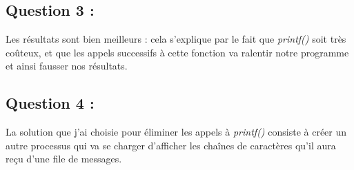 \documentclass{article}
\begin{document}
\subsection*{Question 3 :}

Les résultats sont bien meilleurs : cela s'explique par le fait que \textit{printf()} soit très coûteux, et que les appels successifs à cette fonction va ralentir notre programme et ainsi fausser nos résultats.

\subsection*{Question 4 :}

La solution que j'ai choisie pour éliminer les appels à \textit{printf()} consiste à créer un autre processus qui va se charger d'afficher les chaînes de caractères qu'il aura reçu d'une file de messages.

\end{document}
